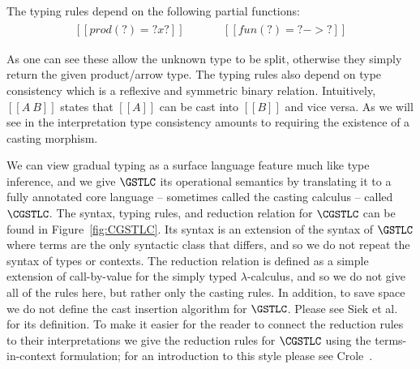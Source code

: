 The typing rules depend on the following partial functions:
\[
\begin{array}{lll}
  \begin{array}{lll}
  [[prod(?) = ? x ?]]\\
  [[prod(A1 x A2) = A1 x A2]]\\
  \end{array}
  & \quad &
  \begin{array}{lll}
  [[fun(?) = ? -> ?]]\\
  [[fun(A1 -> A2) = A1 -> A2]]\\
\end{array}
\end{array}
\]
As one can see these allow the unknown type to be split, otherwise
they simply return the given product/arrow type.  The typing rules
also depend on type consistency which is a reflexive and symmetric
binary relation.  Intuitively, $[[A ~ B]]$ states that $[[A]]$ can
be cast into $[[B]]$ and vice versa.  As we will see in the
interpretation type consistency amounts to requiring the existence of
a casting morphism.

We can view gradual typing as a surface language feature much like
type inference, and we give $\GSTLC$ its operational semantics by
translating it to a fully annotated core language -- sometimes called
the casting calculus -- called $\CGSTLC$. The syntax, typing rules,
and reduction relation for $\CGSTLC$ can be found in
Figure~\ref{fig:CGSTLC}. Its syntax is an extension of the syntax of
$\GSTLC$ where terms are the only syntactic class that differs, and so
we do not repeat the syntax of types or contexts. The reduction
relation is defined as a simple extension of call-by-value for the
simply typed $\lambda$-calculus, and so we do not give all of the
rules here, but rather only the casting rules.  In addition, to save
space we do not define the cast insertion algorithm for $\GSTLC$.
Please see Siek et al.~\cite{Siek:2015} for its definition.  To make
it easier for the reader to connect the reduction rules to their
interpretations we give the reduction rules for $\CGSTLC$ using the
terms-in-context formulation; for an introduction to this style please
see Crole~\cite{Crole:1994}.

